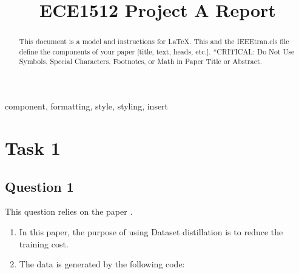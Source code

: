 \documentclass[conference]{IEEEtran}
\begin{document}
\title{ECE1512 Project A Report}

\author{
}

\maketitle

\begin{abstract}
This document is a model and instructions for \LaTeX.
This and the IEEEtran.cls file define the components of your paper [title, text, heads, etc.]. *CRITICAL: Do Not Use Symbols, Special Characters, Footnotes, 
or Math in Paper Title or Abstract.
\end{abstract}

\begin{IEEEkeywords}
component, formatting, style, styling, insert
\end{IEEEkeywords}

\section{Task 1}
\subsection{Question 1}
This question relies on the paper \cite{sajedi2023datadam}.
\begin{enumerate}[label=(\alph*)]
    \item In this paper, the purpose of using Dataset distillation is to reduce the training cost.
    \item The data is generated by the following code:
\end{enumerate}



\end{document}
